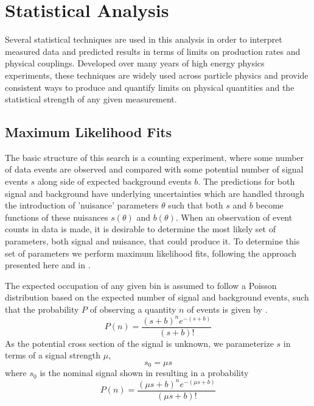 \chapter{Statistical Analysis}
\label{analysis_chapter}
Several statistical techniques are used in this analysis in order to interpret measured data and predicted results in terms of limits on production rates and physical couplings.
Developed over many years of high energy physics experiments, these techniques are widely used across particle physics and provide consistent ways to produce and quantify limits on physical quantities and the statistical strength of any given measurement.

\section{Maximum Likelihood Fits}
The basic structure of this search is a counting experiment, where some number of data events are observed and compared with some potential number of signal events $s$ along side of expected background events $b$. 
The predictions for both signal and background have underlying uncertainties which are handled through the introduction of 'nuisance' parameters $\theta$ such that both $s$ and $b$ become functions of these nuisances $s(\theta)$ and $b(\theta)$.
When an observation of event counts in data is made, it is desirable to determine the most likely set of parameters, both signal and nuisance, that could produce it. 
To determine this set of parameters we perform maximum likelihood fits, following the approach presented here and in \cite{conway2011}. 

The expected occupation of any given bin is assumed to follow a Poisson distribution based on the expected number of signal and background events, such that the probability $P$ of observing a quantity $n$ of events is given by .
\begin{equation}
	\label{eq:poisProb}
	P(n) = \frac{(s+b)^{n}e^{-(s+b)}}{(s+b)!}
\end{equation}
As the potential cross section of the signal is unknown, we parameterize $s$ in terms of a signal strength $\mu$,
\begin{equation}
	s_0 = \mu s
\end{equation}
where $s_0$ is the nominal signal shown in  resulting in a probability
\begin{equation}
	P(n) = \frac{(\mu s+b)^{n}e^{-(\mu s+b)}}{(\mu s+b)!}
\end{equation}

